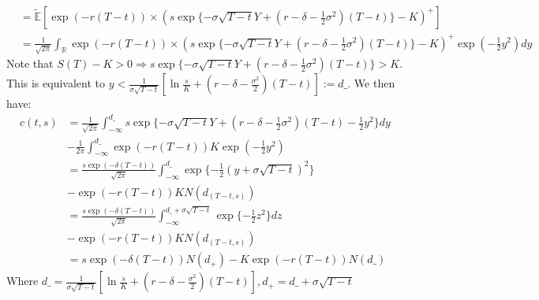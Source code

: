 \documentclass[12pt,twoside, letter]{exam}
\theoremstyle{definition}
\newcommand{\rr}{\mathbb{R}}
\begin{document}
\begin{enumerate}
\begin{solution}
\begin{align*}
          &= \tilde{\mathbb{E}}[\exp(-r(T-t))\times( s\exp\{ -\sigma\sqrt{T-t} Y+(r - \delta - \frac{1}{2}\sigma^2)(T-t) \} - K)^+] \\
          &= \frac{1}{\sqrt{2\pi}} \int_{\rr} \exp(-r(T-t))\times( s\exp\{ -\sigma\sqrt{T-t} Y+(r - \delta - \frac{1}{2}\sigma^2)(T-t) \} - K)^+\exp(-\frac{1}{2}y^2) dy
        \end{align*}
        Note that $S(T) - K > 0 \Rightarrow s\exp\{ -\sigma\sqrt{T-t} Y+(r - \delta - \frac{1}{2}\sigma^2)(T-t) \} > K$. This is equivalent to
        $y < \frac{1}{\sigma\sqrt{T-t}}[\ln{\frac{s}{K}}+(r-\delta-\frac{\sigma^2}{2})(T-t)] := d\_$.
        We then have:
        \begin{align*}
          c(t,s) &= \frac{1}{\sqrt{2\pi}}\int^{d\_}_{-\infty} s\exp\{-\sigma\sqrt{T-t} Y+(r-\delta-\frac{1}{2}\sigma^2)(T-t)-\frac{1}{2}y^2\}dy \\
          &- \frac{1}{2\pi} \int^{d\_}_{-\infty} \exp(-r(T-t)) K \exp(-\frac{1}{2}y^2) \\
          &= \frac{s\exp(-\delta(T-t))}{\sqrt{2\pi}} \int^{d\_}_{-\infty} \exp\{-\frac{1}{2}(y + \sigma\sqrt{T-t})^2\} \\
          &- \exp(-r(T-t))KN(d_(T-t,s)) \\
          &= \frac{s\exp(-\delta(T-t))}{\sqrt{2\pi}} \int^{d\_+\sigma\sqrt{T-t}}_{-\infty} \exp\{-\frac{1}{2}z^2\} dz \\
          &- \exp(-r(T-t))KN(d_(T-t,s)) \\
          &= s\exp(-\delta(T-t))N(d_{+}) - K\exp(-r(T-t))N(d\_)
        \end{align*}
        Where $d\_ = \frac{1}{\sigma\sqrt{T-t}}[\ln{\frac{s}{K}}+(r-\delta-\frac{\sigma^2}{2})(T-t)], d_{+} = d\_ + \sigma\sqrt{T-t}$
      \end{solution}
  \end{enumerate}
\end{document}
